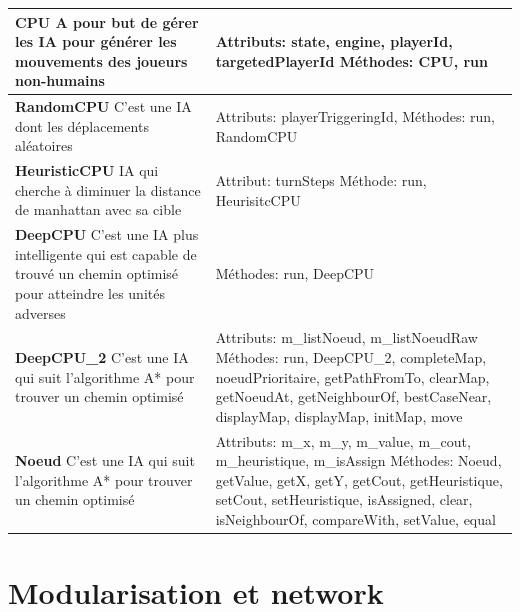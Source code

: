 \phantom{Texte invisible parce que j'ai pas trouvé d'autre méthode pour mettre le tableau à la ligne.}
\begin{tabularx}{15 cm}{|X|X|}
\hline
\textbf{CPU} \newline A pour but de gérer les IA pour générer les mouvements des joueurs non-humains & Attributs: state, engine, playerId, targetedPlayerId   \newline Méthodes: CPU, run\\ 
\hline
\textbf{RandomCPU} \newline C'est une IA dont les déplacements aléatoires & Attributs: playerTriggeringId,  \newline Méthodes: run, RandomCPU\\
\hline
\textbf{HeuristicCPU} \newline IA qui cherche à diminuer la distance de manhattan avec sa cible & Attribut: turnSteps \newline Méthode: run, HeurisitcCPU\\
\hline
\textbf{DeepCPU} \newline C'est une IA plus intelligente qui est capable de trouvé un chemin optimisé pour atteindre les unités adverses & 
\newline Méthodes: run, DeepCPU\\
\hline
\textbf{DeepCPU\_2} \newline C'est une IA qui suit l'algorithme A* pour trouver un chemin optimisé & Attributs: m\_listNoeud, m\_listNoeudRaw
\newline Méthodes: run, DeepCPU\_2, completeMap, noeudPrioritaire, getPathFromTo, clearMap, getNoeudAt, getNeighbourOf, bestCaseNear, displayMap, displayMap, initMap, move\\
\hline
\textbf{Noeud} \newline C'est une IA qui suit l'algorithme A* pour trouver un chemin optimisé & Attributs: m\_x, m\_y, m\_value, m\_cout, m\_heuristique, m\_isAssign
\newline Méthodes: Noeud, getValue, getX, getY, getCout, getHeuristique, setCout, setHeuristique, isAssigned, clear, isNeighbourOf, compareWith, setValue, equal\\
\hline

\end{tabularx}





\section{Modularisation et network}

